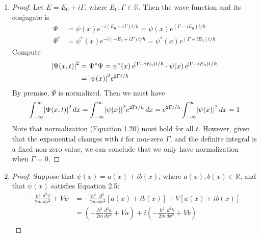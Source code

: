 \documentclass[a4paper]{article}
\begin{document}
\begin{enumerate}[label=(\alph*)]
	\item \begin{proof}[Proof]
	Let \( E = E_{0} + i \Gamma \), where \( E_{0}, \Gamma \in \mathbb{R} \). Then the wave function and its conjugate is
	\begin{align*}
		\Psi & = \psi \!\left( x \right)e^{-i \!\left( E_{0} + i \Gamma \right)t / \hbar} = \psi \!\left( x \right)e^{\!\left( \Gamma - iE_{0} \right)t / \hbar} \\
		\Psi^{*} & = \psi^{*} \!\left( x \right)e^{-i \!\left( -E_{0} + i \Gamma \right)t / \hbar} = \psi^{*} \!\left( x \right)e^{\!\left( \Gamma + iE_{0} \right)t / \hbar}
	\end{align*}
	Compute
	\begin{align*}
		\abs{\Psi \!\left( x,t \right)}^{2} & = \Psi^{*}\Psi = \psi^{*} \!\left( x \right)e^{\!\left( \Gamma + iE_{0} \right)t / \hbar} \cdot \psi \!\left( x \right)e^{\!\left( \Gamma - iE_{0} \right)t / \hbar} \\
						    & = \abs{\psi \!\left( x \right)}^{2}e^{2 \Gamma t / \hbar}
	\end{align*}
	By premise, \( \Psi \) is normalized. Then we must have
	\[
		\int^{\infty}_{-\infty} \abs{\Psi \!\left( x,t \right)}^{2} \, dx = \int^{\infty}_{-\infty} \abs{\psi \!\left( x \right)}^{2}e^{2 \Gamma t / \hbar} \, dx = e^{2 \Gamma t / \hbar}\int^{\infty}_{-\infty} \abs{\psi \!\left( x \right)}^{2} \, dx = 1
	\]
	Note that normalization (Equation 1.20) must hold for all \( t \). However, given that the exponential changes with \( t \) for non-zero \( \Gamma \), and the definite integral is a fixed non-zero value, we can conclude that we only have normalization when \( \Gamma = 0 \).
	\end{proof}
	\item \begin{proof}[Proof]
			Suppose that \( \psi \!\left( x \right) = a \!\left( x \right) + ib \!\left( x \right) \), where \( a \!\left( x \right), b \!\left( x \right) \in \mathbb{R} \), and that \( \psi \!\left( x \right) \) satisfies Equation 2.5:
	\begin{align*}
		-\frac{\hbar^{2}}{2m}\frac{d^2 \psi}{d x^2} + V \psi & = -\frac{\hbar^{2}}{2m}\frac{d^2 }{d x^2}\!\left[ a \!\left( x \right) + ib \!\left( x \right) \right] + V \!\left[ a \!\left( x \right) + ib \!\left( x \right) \right] \\
								     & = \!\left( -\frac{\hbar^{2}}{2m}\frac{d^2 a}{d x^2} + Va \right) + i\!\left( -\frac{\hbar^{2}}{2m}\frac{d^2 b}{d x^2} + Vb \right) \\

\end{align*}
\end{proof}
\end{enumerate}
\end{document}
